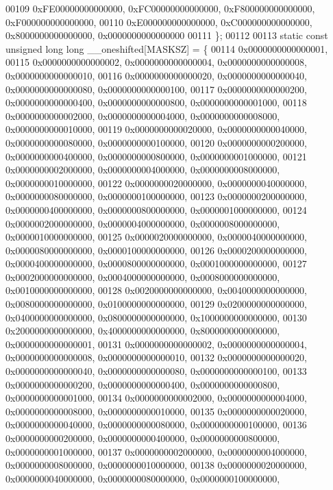 \begin{DoxyCode}
00109         0xFE00000000000000, 0xFC00000000000000, 0xF800000000000000, 0xF000000000000000,
00110         0xE000000000000000, 0xC000000000000000, 0x8000000000000000, 0x0000000000000000
00111 \};
00112 
00113 \textcolor{keyword}{static} \textcolor{keyword}{const} \textcolor{keywordtype}{unsigned} \textcolor{keywordtype}{long} \textcolor{keywordtype}{long} \_\_oneshifted[MASKSZ] = \{
00114         0x0000000000000001,
00115         0x0000000000000002, 0x0000000000000004, 0x0000000000000008, 0x0000000000000010,
00116         0x0000000000000020, 0x0000000000000040, 0x0000000000000080, 0x0000000000000100,
00117         0x0000000000000200, 0x0000000000000400, 0x0000000000000800, 0x0000000000001000,
00118         0x0000000000002000, 0x0000000000004000, 0x0000000000008000, 0x0000000000010000,
00119         0x0000000000020000, 0x0000000000040000, 0x0000000000080000, 0x0000000000100000,
00120         0x0000000000200000, 0x0000000000400000, 0x0000000000800000, 0x0000000001000000,
00121         0x0000000002000000, 0x0000000004000000, 0x0000000008000000, 0x0000000010000000,
00122         0x0000000020000000, 0x0000000040000000, 0x0000000080000000, 0x0000000100000000,
00123         0x0000000200000000, 0x0000000400000000, 0x0000000800000000, 0x0000001000000000,
00124         0x0000002000000000, 0x0000004000000000, 0x0000008000000000, 0x0000010000000000,
00125         0x0000020000000000, 0x0000040000000000, 0x0000080000000000, 0x0000100000000000,
00126         0x0000200000000000, 0x0000400000000000, 0x0000800000000000, 0x0001000000000000,
00127         0x0002000000000000, 0x0004000000000000, 0x0008000000000000, 0x0010000000000000,
00128         0x0020000000000000, 0x0040000000000000, 0x0080000000000000, 0x0100000000000000,
00129         0x0200000000000000, 0x0400000000000000, 0x0800000000000000, 0x1000000000000000,
00130         0x2000000000000000, 0x4000000000000000, 0x8000000000000000, 0x0000000000000001,
00131         0x0000000000000002, 0x0000000000000004, 0x0000000000000008, 0x0000000000000010,
00132         0x0000000000000020, 0x0000000000000040, 0x0000000000000080, 0x0000000000000100,
00133         0x0000000000000200, 0x0000000000000400, 0x0000000000000800, 0x0000000000001000,
00134         0x0000000000002000, 0x0000000000004000, 0x0000000000008000, 0x0000000000010000,
00135         0x0000000000020000, 0x0000000000040000, 0x0000000000080000, 0x0000000000100000,
00136         0x0000000000200000, 0x0000000000400000, 0x0000000000800000, 0x0000000001000000,
00137         0x0000000002000000, 0x0000000004000000, 0x0000000008000000, 0x0000000010000000,
00138         0x0000000020000000, 0x0000000040000000, 0x0000000080000000, 0x0000000100000000,

\end{DoxyCode}
